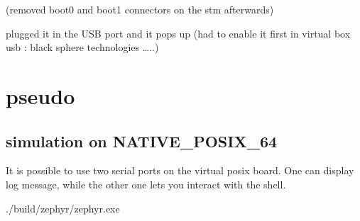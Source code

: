 \documentclass[letterpaper,10pt,english]{sphinxmanual}
\begin{document}
\noindent{}

(removed boot0 and boot1 connectors on the stm afterwards)

plugged it in the USB port and it pops up (had to enable it first in virtual box usb : black sphere technologies …..)


\section{pseudo}
\label{\detokenize{debugging/pseudo:pseudo}}\label{\detokenize{debugging/pseudo::doc}}

\subsection{simulation on NATIVE\_POSIX\_64}
\label{\detokenize{debugging/pseudo:simulation-on-native-posix-64}}
It is possible to use two serial ports on the virtual posix board.
One can display log message, while the other one lets you interact with the shell.

\begin{sphinxVerbatim}[commandchars=\\\{\}]
\end{sphinxVerbatim}

\begin{sphinxVerbatim}[commandchars=\\\{\}]
 ./build/zephyr/zephyr.exe


\end{sphinxVerbatim}

\begin{sphinxVerbatim}[commandchars=\\\{\}]
\end{sphinxVerbatim}
\end{document}
